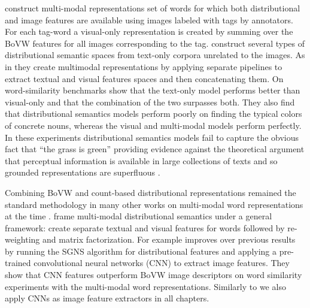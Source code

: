 \cite{bruni2012distributional} construct multi-modal representations set of words for which
both distributional and image features are available using images labeled with tags by annotators. 
For each tag-word a visual-only representation is created by summing over the BoVW features
for all images corresponding to the tag.
\cite{bruni2012distributional} construct several types of distributional semantic spaces
from text-only corpora unrelated to the images.
As in \cite{feng2010visual} they create multimodal representations by applying
separate pipelines to extract textual and visual features spaces and then concatenating them.
On word-similarity benchmarks \cite{bruni2012distributional} show that the text-only model performs better than visual-only
and that the combination of the two surpasses both.
They also find that distributional semantics
models perform poorly on finding the typical colors of concrete nouns,
whereas the visual and multi-modal models perform perfectly. In these experiments
distributional semantics models fail to capture the obvious fact that ``the grass is green''
providing evidence against the theoretical argument that perceptual information is available in
large collections of texts and so grounded representations are superfluous \citep{louwerse2011symbol}.

Combining BoVW and count-based distributional representations remained the standard methodology
in many other works on multi-modal word representations at the time
\citep{bruni2011distributional,leong2011going,leong2011measuring}.
\cite{bruni2014multimodal} frame multi-modal distributional semantics under a general framework:
create separate textual and visual features for words followed by
re-weighting and matrix factorization. For example \cite{kiela2014learning} improves over previous 
results by running the SGNS algorithm for distributional features and
applying a pre-trained convolutional neural networks (CNN) to extract image features. 
They show that CNN features outperform BoVW image descriptors on word similarity
experiments with the multi-modal word representations.
Similarly to \cite{kiela2014learning} we also apply CNNs as image feature extractors in all chapters.



